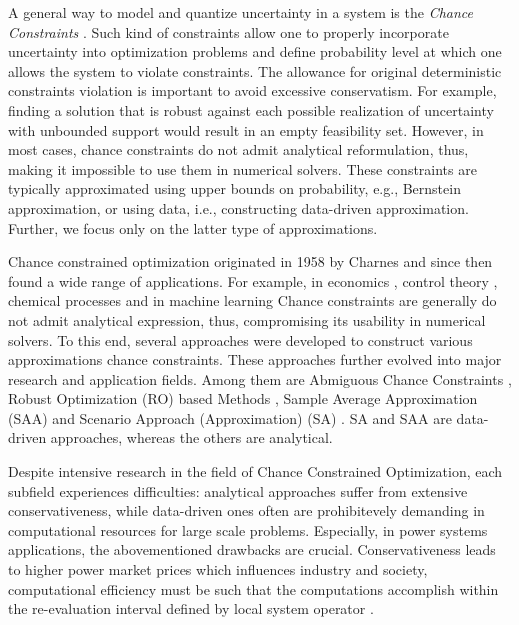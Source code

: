 A general way to model and quantize uncertainty in a system is the \emph{Chance Constraints} \cite{geng2019data}. Such kind of constraints allow one to properly incorporate uncertainty into optimization problems and define probability level at which one allows the system to violate constraints. The allowance for original deterministic constraints violation is important to avoid excessive conservatism. For example, finding a solution that is robust against each possible realization of uncertainty with unbounded support would result in an empty feasibility set. However, in most cases, chance constraints do not admit analytical reformulation, thus, making it impossible to use them in numerical solvers. These constraints are typically approximated using upper bounds on probability, e.g., Bernstein approximation, \cite{nemirovski2007convex} or using data, i.e., constructing data-driven approximation. Further, we focus only on the latter type of approximations.

Chance constrained optimization originated in 1958 by Charnes \cite{charnes1958cost} and since then found a wide range of applications. For example, in economics \cite{yaari1965uncertain}, control theory \cite{calafiore2006scenario}, chemical processes \cite{sahinidis2004optimization} and in machine learning \cite{bertsimas2018robust,caramanis2011robust}  Chance constraints are generally do not admit analytical expression, thus, compromising its usability in numerical solvers. To this end, several approaches were developed to construct various approximations chance constraints. These approaches further evolved into major research and application fields. Among them are Abmiguous Chance Constraints \cite{nemirovski2012safe, ben2009robust}, Robust Optimization (RO) based Methods \cite{bertsimas2011theory}, Sample Average Approximation (SAA) \cite{sen1992relaxations, ahmed2008solving} and Scenario Approach (Approximation) (SA) \cite{calafiore2005uncertain}. SA and SAA are data-driven approaches, whereas the others are analytical.


Despite intensive research in the field of Chance Constrained Optimization, each subfield experiences difficulties: analytical approaches suffer from extensive conservativeness, while data-driven ones often are prohibitevely demanding in computational resources for large scale problems. Especially, in power systems applications, the abovementioned drawbacks are crucial. Conservativeness leads to higher power market prices which influences industry and society, computational efficiency must be such that the computations accomplish within the re-evaluation interval defined by local system operator \cite{chen2008probabilistic, koutsoyiannis2016unavoidable, stott2012optimal}.

